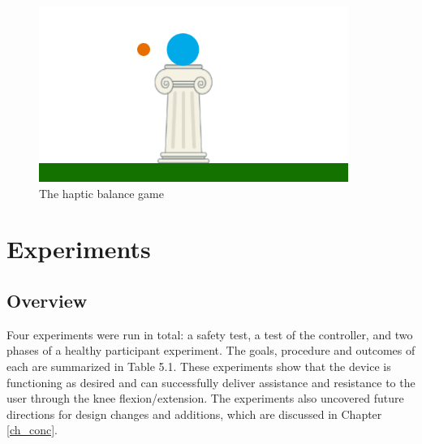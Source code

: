 \documentclass[12pt]{report}
\begin{document}
\begin{figure}[h] 
		\centering
		\includegraphics[width=0.75\linewidth]{balance_game}
		\caption{The haptic balance game}
		\label{fig:balance_game}
	\end{figure} 
			

	
\chapter{Experiments}

	\section{Overview}
	
	Four experiments were run in total: a safety test, a test of the controller, and two phases of a healthy participant experiment. The goals, procedure and outcomes of each are summarized in Table 5.1. These experiments show that the device is functioning as desired and can successfully deliver assistance and resistance to the user through the knee flexion/extension. The experiments also uncovered future directions for design changes and additions, which are discussed in Chapter \ref{ch_conc}. 
	
\end{document}
